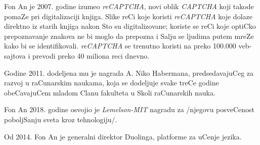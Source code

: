 \documentclass{article}
\begin{document}
Fon An je 2007. godine izumeo \textit{reCAPTCHA}, novi oblik \textit{CAPTCHA} koji takode pomaZe pri digitalizaciji knjiga. Slike reCi koje koristi \textit{reCAPTCHA} koje dolaze direktno iz starih knjiga nakon Sto su digitalizovane; koriste se reCi koje optiCko prepoznavanje znakova ne bi moglo da prepozna i Salju se ljudima putem mreZe kako bi se identifikovali. \textit{reCAPTCHA} se trenutno koristi na preko 100.000 veb-sajtova i prevodi preko 40 miliona reci dnevno.

Godine 2011. dodeljena mu je nagrada A. Niko Habermana, predsedavajuCeg za razvoj u raCunarskim naukama, koja se dodeljuje svake treCe godine obeCavajuCem mladom Clanu fakulteta u Skoli raCunarskih nauka.

Fon An 2018. godine osvojio je \textit{Lemelson-MIT} nagradu za /njegovu posveCenost poboljSanju sveta kroz tehnologiju/.

Od 2014. Fon An je generalni direktor Duolinga, platforme za uCenje jezika.
\end{document}
